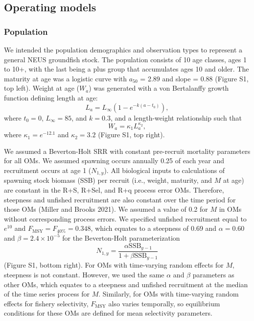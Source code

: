 \documentclass[
  12pt,
]{article}
\newcommand{\Fmsy}{\ensuremath{F_{\text{MSY}}}\xspace}
\begin{document}
\subsection*{Operating models}\label{operating-models}

\subsubsection*{Population}\label{population}

We intended the population demographics and observation types to
represent a general NEUS groundfish stock. The population consists of 10
age classes, ages 1 to 10+, with the last being a plus group that
accumulates ages 10 and older. The maturity at age was a logistic curve
with \(a_{50}\) = 2.89 and slope = 0.88 (Figure S1, top left). Weight at
age (\(W_a\)) was generated with a von Bertalanffy growth function
defining length at age: \[
L_a = L_{\infty}\left(1 - e^{-k(a - t_0)}\right),
\] where \(t_0 = 0\), \(L_\infty = 85\), and \(k = 0.3\), and a
length-weight relationship such that \[
W_a = \kappa_1 L_a^{\kappa_2},
\] where \(\kappa_1 = e^{-12.1}\) and \(\kappa_2 = 3.2\) (Figure S1, top
right).

We assumed a Beverton-Holt SRR with constant pre-recruit mortality
parameters for all OMs. We assumed spawning occurs annually 0.25 of each
year and recruitment occurs at age 1 (\(N_{1,y}\)). All biological
inputs to calculations of spawning stock biomass (SSB) per recruit
(i.e., weight, maturity, and \(M\) at age) are constant in the R+S,
R+Sel, and R+q process error OMs. Therefore, steepness and unfished
recruitment are also constant over the time period for those OMs (Miller
and Brooks 2021). We assumed a value of 0.2 for \(M\) in OMs without
corresponding process errors. We specified unfished recruitment equal to
\(e^{10}\) and \(\Fmsy = F_{40\%} = 0.348\), which equates to a
steepness of 0.69 and \(\alpha=0.60\) and \(\beta = 2.4 \times 10^{-5}\)
for the Beverton-Holt parameterization \[
N_{1,y} = \frac{\alpha \text{SSB}_{y-1}}{1 + \beta\text{SSB}_{y-1}} 
\] (Figure S1, bottom right). For OMs with time-varying random effects
for \(M\), steepness is not constant. However, we used the same
\(\alpha\) and \(\beta\) parameters as other OMs, which equates to a
steepness and unfished recruitment at the median of the time series
process for \(M\). Similarly, for OMs with time-varying random effects
for fishery selectivity, \Fmsy also varies temporally, so equilibrium
conditions for these OMs are defined for mean selectivity parameters.
\end{document}
